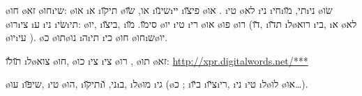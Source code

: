 \o{חו} \o{זא} \o{חו}\i{שי}:  \o{או}  \i{א} \i{תי}\u{קו} \o{או}, \u{שׂו}  \i{שי}\u{נו}\i{יי} \i{פי}\u{צו} \o{או} .  \i{טי} \o{לא} \i{ני} \i{חי}\i{תי},   \u{מו}\i{ני} \o{שׂו}   \o{רו}\i{צי} \i{ע}  \i{ני} \i{שׂי}\i{תי}: \o{יו}, \i{בי}\u{צו}, \i{סי}\u{מו}.  \u{מו}    \o{יו} \i{טי} \i{רי} \o{או} \o{פו} \o{רו} (\u{דו}, \i{ת}\u{דו} \i{ל}\o{רוא} \i{בי}, \i{א}  \o{לא} \o{יו}\i{עי} ).  \o{כ} \o{תו}\o{נו} \i{ה}\i{תי}   \i{כי}  \o{חו}  \o{חו}\i{ש}\o{יו}.

\u{תו}\u{לו} \i{ל}\o{צוא}  \o{חו}, \o{כו} \i{צי}  \i{צי} \o{רו} , \o{תו} \o{זא}: \url{http://xpr.digitalwords.net/***}

  \o{עו} \i{שי}\u{פּו}, \i{טי} \o{הו}, \i{תי}\u{קו}\i{ני}, \u{ו}\i{ב},  \i{ל}\o{מו}     \i{גי} (\o{כ} ; \i{ב}\u{יו}   \i{צ}\u{יו}\i{רי}, \i{ני} \i{טי}\gnuva {} \i{ל}\o{לו} \o{או}…).

